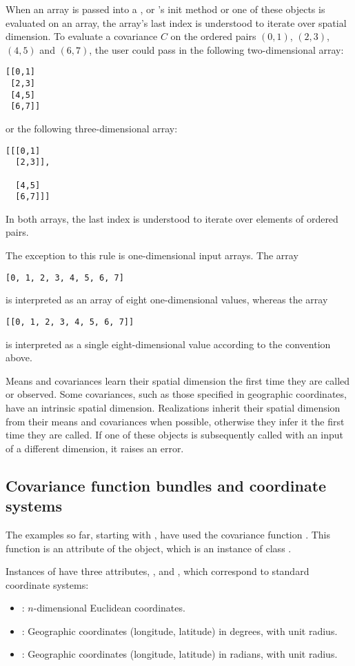 \documentclass[article]{jss}
\begin{document}
When an array is passed into a ,  or 's init method or one of these objects is evaluated on an array, the array's last index is understood to iterate over spatial dimension. To evaluate a covariance $C$ on the ordered pairs $(0,1)$, $(2,3)$, $(4,5)$ and $(6,7)$, the user could pass in the following two-dimensional  array:
\begin{verbatim}
[[0,1]
 [2,3]
 [4,5]
 [6,7]]
\end{verbatim}
or the following three-dimensional array:
\begin{verbatim}
[[[0,1]
  [2,3]],

  [4,5]
  [6,7]]]
\end{verbatim}
In both arrays, the last index is understood to iterate over elements of ordered pairs.

The exception to this rule is one-dimensional input arrays. The array
\begin{verbatim}
[0, 1, 2, 3, 4, 5, 6, 7]
\end{verbatim}
is interpreted as an array of eight one-dimensional values, whereas the array
\begin{verbatim}
[[0, 1, 2, 3, 4, 5, 6, 7]]
\end{verbatim}
is interpreted as a single eight-dimensional value according to the convention above.

Means and covariances learn their spatial dimension the first time they are called or observed. Some covariances, such as those specified in geographic coordinates, have an intrinsic spatial dimension. Realizations inherit their spatial dimension from their means and covariances when possible, otherwise they infer it the first time they are called. If one of these objects is subsequently called with an input of a different dimension, it raises an error.

\subsection{Covariance function bundles and coordinate systems}
The examples so far, starting with , have used the covariance function . This function is an attribute of the  object, which is an instance of class .

Instances of  have three attributes, ,  and , which correspond to standard coordinate systems:
\begin{itemize}
    \item {}: $n$-dimensional Euclidean coordinates.
    \item {}: Geographic coordinates (longitude, latitude) in degrees, with unit radius.
    \item {}: Geographic coordinates (longitude, latitude) in radians, with unit radius.
\end{itemize}
\end{document}
